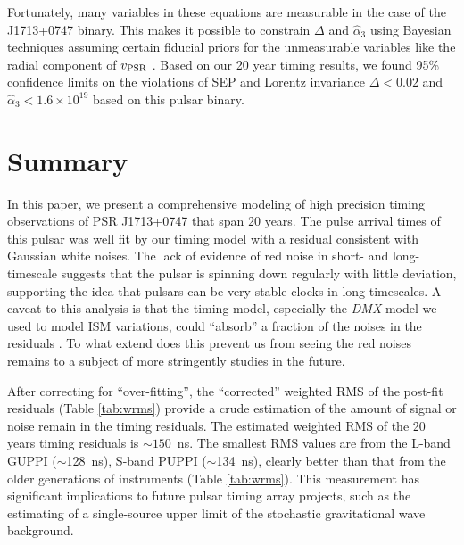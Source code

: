 Fortunately, many variables in these equations are measurable in the
case of the J1713+0747 binary. This makes it possible to constrain $\Delta$
and $\hat{\alpha}_3$ using Bayesian techniques assuming certain fiducial
priors for the unmeasurable variables like the radial component of
$v_{\rm PSR}$ \citep{sns+05, sfl+05, gsf+11}. Based on our 20 year 
timing results, we found 95\% confidence limits on the violations of SEP and
Lorentz invariance $\Delta < 0.02$ and $\hat{\alpha}_3<1.6\times10^{19}$ based on this pulsar binary.


\section{Summary}
In this paper, we present a comprehensive modeling of high precision timing observations of
PSR J1713+0747 that span 20 years. 
The pulse arrival times of this pulsar was well fit by our timing model with a
residual consistent with Gaussian white noises.
The lack of evidence of red noise in short- and long-timescale suggests that
the pulsar is spinning down regularly with little deviation, supporting the
idea that pulsars can be very stable clocks in long timescales.
A caveat to this analysis is that the timing model, especially the
\textit{DMX} model we used to model ISM variations, could ``absorb'' a fraction
of the noises in the residuals \citep{kcs+13}. To what extend does this prevent us from
seeing the red noises remains to a subject of more stringently studies in the
future.

After correcting for ``over-fitting'', the ``corrected'' weighted RMS of the post-fit residuals (Table \ref{tab:wrms}) provide a crude estimation of
the amount of signal or noise remain in the timing residuals. The estimated
weighted RMS of the 20 years timing residuals is $\sim 150$~ns. The smallest
RMS values are from the L-band GUPPI ($\sim$128~ns), S-band PUPPI ($\sim$134~ns),
clearly better than that from the older generations of instruments 
(Table \ref{tab:wrms}).
This measurement has significant implications to future pulsar timing array
projects, such as the estimating of a single-source
upper limit of the stochastic gravitational wave background.


